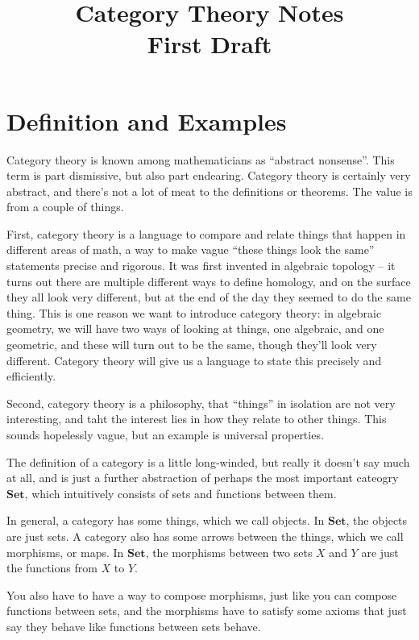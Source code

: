 \documentclass{amsart}
\title{Category Theory Notes \\ First Draft
}
\theoremstyle{definition}
\begin{document}
\maketitle

\section{Definition and Examples}


Category theory is known among mathematicians as ``abstract nonsense''.  This term is part dismissive, but also part endearing.  Category theory is certainly very abstract, and there's not a lot of meat to the definitions or theorems.  The value is from a couple of things.

First, category theory is a language to compare and relate things that happen in different areas of math, a way to make vague ``these things look the same'' statements precise and rigorous.  It was first invented in algebraic topology -- it turns out there are multiple different ways to define homology, and on the surface they all look very different, but at the end of the day they seemed to do the same thing.  This is one reason we want to introduce category theory: in algebraic geometry, we will have two ways of looking at things, one algebraic, and one geometric, and these will turn out to be the same, though they'll look very different.  Category theory will give us a language to state this precisely and efficiently.

Second, category theory is a philosophy, that ``things'' in isolation are not very interesting, and taht the interest lies in how they relate to other things.  This sounds hopelessly vague, but an example is universal properties.





The definition of a category is a little long-winded, but really it doesn't say much at all, and is just a further abstraction of perhaps the most important cateogry $\textbf{Set}$, which intuitively consists of sets and functions between them.

In general, a category has some things, which we call objects.  In $\textbf{Set}$, the objects are just sets.  A category also has some arrows between the things, which we call morphisms, or maps.  In $\textbf{Set}$, the morphisms between two sets $X$ and $Y$ are just the functions from $X$ to $Y$.  

You also have to have a way to compose morphisms, just like you can compose functions between sets, and the morphisms have to satisfy some axioms that just say they behave like functions between sets behave.  
\end{document}

